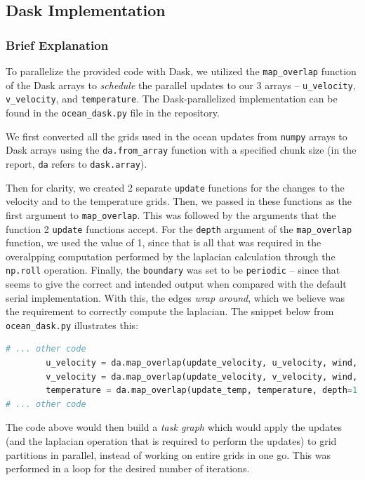 \documentclass[a4paper,12pt]{article}
\begin{document}
\subsection{Dask Implementation}

\subsubsection{Brief Explanation}
To parallelize the provided code with Dask, we utilized the \verb|map_overlap| function of the Dask arrays to \textit{schedule} the parallel updates to our 3 arrays -- \verb|u_velocity|, \verb|v_velocity|, and \verb|temperature|. The Dask-parallelized implementation can be found in the \verb|ocean_dask.py| file in the repository.

We first converted all the grids used in the ocean updates from \verb|numpy| arrays to Dask arrays using the \verb|da.from_array| function with a specified chunk size (in the report, \verb|da| refers to \verb|dask.array|). 

Then for clarity, we created 2 separate \verb|update| functions for the changes to the velocity and to the temperature grids. Then, we passed in these functions as the first argument to \verb|map_overlap|. This was followed by the arguments that the function 2 \verb|update| functions accept. For the \verb|depth| argument of the \verb|map_overlap| function, we used the value of 1, since that is all that was required in the overalpping computation performed by the laplacian calculation through the \verb|np.roll| operation. Finally, the \verb|boundary| was set to be \verb|periodic| -- since that seems to give the correct and intended output when compared with the default serial implementation. With this, the edges \textit{wrap around}, which we believe was the requirement to correctly compute the laplacian. The snippet below from \verb|ocean_dask.py| illustrates this:

\begin{lstlisting}[language=python,basicstyle=\tiny\ttfamily]
# ... other code
        u_velocity = da.map_overlap(update_velocity, u_velocity, wind, depth=1, boundary="periodic", dtype=da.float64)
        v_velocity = da.map_overlap(update_velocity, v_velocity, wind, depth=1, boundary="periodic", dtype=da.float64)
        temperature = da.map_overlap(update_temp, temperature, depth=1, boundary="periodic", dtype=da.float64)
# ... other code

\end{lstlisting}
The code above would then build a \textit{task graph} which would apply the updates (and the laplacian operation that is required to perform the updates) to grid partitions in parallel, instead of working on entire grids in one go. This was performed in a loop for the desired number of iterations. 
\end{document}

